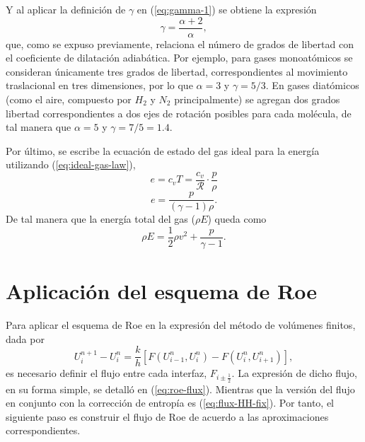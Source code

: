 Y al aplicar la definición de $\gamma$ en (\ref{eq:gamma-1}) se obtiene la expresión
\begin{equation}
	\gamma = \frac{\alpha + 2}{\alpha},
\end{equation}
que, como se expuso previamente, relaciona el número de grados de libertad con el coeficiente de dilatación adiabática. Por ejemplo, para gases monoatómicos se consideran únicamente tres grados de libertad, correspondientes al movimiento traslacional en tres dimensiones, por lo que $\alpha = 3$ y $\gamma = 5/3$. En gases diatómicos (como el aire, compuesto por $H_2$ y $N_2$ principalmente) se agregan dos grados libertad correspondientes a dos ejes de rotación posibles para cada molécula, de tal manera que $\alpha = 5$ y $\gamma = 7/5 = 1.4$.

Por último, se escribe la ecuación de estado del gas ideal para la energía utilizando  (\ref{eq:ideal-gas-law}),
\begin{equation}
	e = c_v T = \frac{c_v}{\mathcal{R}}\cdot\frac{p}{\rho}
\end{equation}
\begin{equation}
	e = \frac{p}{(\gamma - 1) \rho}.
\end{equation}
De tal manera que la energía total del gas ($\rho E$) queda como
\begin{equation}
	 \rho E = \frac{1}{2}\rho v^{2} + \frac{p}{\gamma - 1}.
\end{equation}
\section{Aplicación del esquema de Roe}
Para aplicar el esquema de Roe en la expresión del método de volúmenes finitos, dada por 
\begin{equation}
	U_{i}^{n+1}-U_{i}^{n} = 
	\frac{k}{h}\left[ F(U_{i-1}^n, U_i^n) - F(U_{i}^n, U_{i+1}^n) \right],
	\label{eq:metodo-vol-finitos-3}
\end{equation}
 es necesario definir el flujo entre cada interfaz, $F_{i\pm \frac{1}{2}}$. La expresión de dicho flujo, en su forma simple, se detalló en (\ref{eq:roe-flux}). Mientras que la versión del flujo en conjunto con la corrección de entropía es (\ref{eq:flux-HH-fix}). Por tanto, el siguiente paso es construir el flujo de Roe de acuerdo a las aproximaciones correspondientes.
